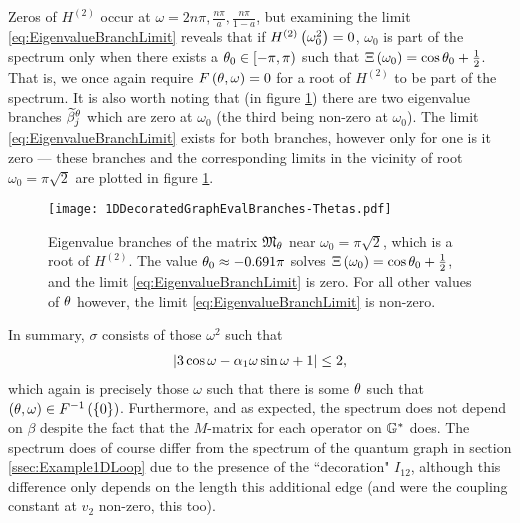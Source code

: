 Zeros of $H^{(2)}$ occur at $\omega= 2n\pi, \frac{n\pi}{a}, \frac{n\pi}{1-a}$, but examining the limit \eqref{eq:EigenvalueBranchLimit} reveals that if $H^{(2)}\left( \omega_0^2 \right)=0$, $\omega_0$ is part of the spectrum only when there exists a $\theta_0\in\left[-\pi,\pi\right)$ such that $\Xi\left( \omega_0 \right)=\cos\theta_0+\frac{1}{2}$.
That is, we once again require $F\left( \theta,\omega \right)=0$ for a root of $H^{(2)}$ to be part of the spectrum.
It is also worth noting that (in figure \ref{fig:1DDecoratedGraphEvalBranches-Thetas}) there are two eigenvalue branches $\widetilde{\beta}_j^{\theta}$ which are zero at $\omega_0$ (the third being non-zero at $\omega_0$).
The limit \eqref{eq:EigenvalueBranchLimit} exists for both branches, however only for one is it zero --- these branches and the corresponding limits in the vicinity of root $\omega_0=\pi\sqrt{2}$ are plotted in figure \ref{fig:1DDecoratedGraphEvalBranches-Thetas}.
\begin{figure}[b!]
	\centering
	\texttt{[image: 1DDecoratedGraphEvalBranches-Thetas.pdf]}
	\caption[Eigenvalue branches of the $M$-matrix near a pole of the determinant, for the geometry of section \ref{ssec:EmbeddingDependentExample}.]{\label{fig:1DDecoratedGraphEvalBranches-Thetas} Eigenvalue branches of the matrix $\mathfrak{M}_{\theta}$ near $\omega_0 = \pi\sqrt{2}$, which is a root of $H^{(2)}$. The value $\theta_0\approx-0.691\pi$ solves $\Xi\left( \omega_0 \right)=\cos\theta_0+\frac{1}{2}$, and the limit \eqref{eq:EigenvalueBranchLimit} is zero. For all other values of $\theta$ however, the limit \eqref{eq:EigenvalueBranchLimit} is non-zero.}
\end{figure}

In summary, $\sigma$ consists of those $\omega^2$ such that
\begin{align*}
	\left\lvert  3\cos\omega - \alpha_1\omega\sin\omega + 1  \right\rvert \leq 2,
\end{align*}
which again is precisely those $\omega$ such that there is some $\theta$ such that $\left( \theta,\omega \right)\in F^{-1}\left( \left\{ 0 \right\} \right)$.
Furthermore, and as expected, the spectrum does not depend on $\beta$ despite the fact that the $M$-matrix for each operator on $\mathbb{G}^*$ does.
The spectrum does of course differ from the spectrum of the quantum graph in section \ref{ssec:Example1DLoop} due to the presence of the ``decoration" $I_{12}$, although this difference only depends on the length this additional edge (and were the coupling constant at $v_2$ non-zero, this too).

